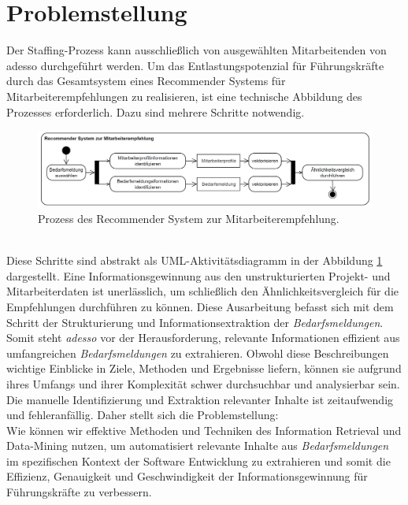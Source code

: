 \section{Problemstellung}
\label{sec:problemstellung}
Der Staffing-Prozess kann ausschließlich von ausgewählten Mitarbeitenden von adesso durchgeführt werden. Um das Entlastungspotenzial für Führungskräfte durch das Gesamtsystem eines Recommender Systems für Mitarbeiterempfehlungen zu realisieren, ist eine technische Abbildung des Prozesses erforderlich. Dazu sind mehrere Schritte notwendig.
\begin{figure}[H]
	\centering  
	\includegraphics[width=\linewidth]{Abbildungen/recommendersystem.png}
	\caption{Prozess des Recommender System zur Mitarbeiterempfehlung.}
	\label{fig:recommendersystem}
\end{figure}\mbox{} \\
Diese Schritte sind abstrakt als UML-Aktivitätsdiagramm in der Abbildung \ref{fig:recommendersystem} dargestellt. Eine Informationsgewinnung aus den unstrukturierten Projekt- und Mitarbeiterdaten ist unerlässlich, um schließlich den Ähnlichkeitsvergleich für die Empfehlungen durchführen zu können. Diese Ausarbeitung befasst sich mit dem Schritt der Strukturierung und Informationsextraktion der \emph{Bedarfsmeldungen}. Somit steht \emph{adesso} vor der Herausforderung, relevante Informationen effizient aus umfangreichen \emph{Bedarfsmeldungen} zu extrahieren. Obwohl diese Beschreibungen wichtige Einblicke in Ziele, Methoden und Ergebnisse liefern, können sie aufgrund ihres Umfangs und ihrer Komplexität schwer durchsuchbar und analysierbar sein. Die manuelle Identifizierung und Extraktion relevanter Inhalte ist zeitaufwendig und fehleranfällig. Daher stellt sich die Problemstellung: \\

Wie können wir effektive Methoden und Techniken des Information Retrieval und Data-Mining nutzen, um automatisiert relevante Inhalte aus \emph{Bedarfsmeldungen} im spezifischen Kontext der Software Entwicklung zu extrahieren und somit die Effizienz, Genauigkeit und Geschwindigkeit der Informationsgewinnung für Führungskräfte zu verbessern.\\

